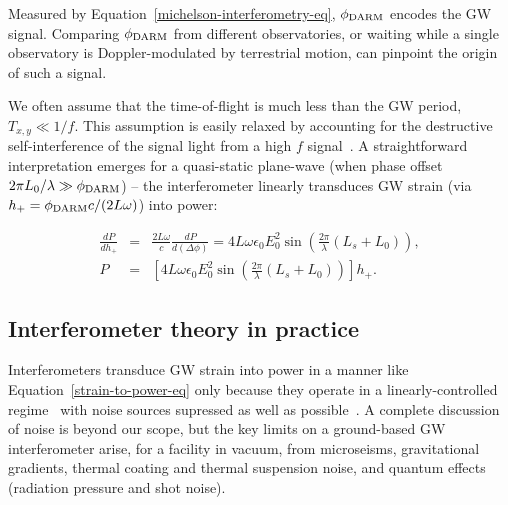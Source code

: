 \noindent Measured by Equation~\ref{michelson-interferometry-eq}, $\phi_{\textup{DARM}}$ encodes the GW signal.
Comparing $\phi_{\textup{DARM}}$ from different observatories, or waiting while a single observatory is Doppler-modulated by terrestrial motion, can pinpoint the origin of such a signal.

We often assume that the time-of-flight is much less than the GW period, $T_{x,y} \ll 1/f$.
This assumption is easily relaxed by accounting for the destructive self-interference of the signal light from a high $f$ signal~\cite{Saulson}.
A straightforward interpretation emerges for a quasi-static plane-wave (when phase offset $2\pi L_0/\lambda \gg \phi_\textup{DARM}$) -- the interferometer linearly transduces GW strain (via $h_+ = \phi_\textup{DARM}c/(2L\omega)$) into power:

\begin{eqnarray}
\frac{d P}{d h_+} &=& \frac{2L\omega}{c}\frac{dP}{d(\Delta\phi)} = 4 L\omega \epsilon_0 E_0^2 \sin \left(\frac{2\pi}{\lambda} (L_s+L_0) \right),\\
P &=& \left[ 4 L \omega \epsilon_0 E_0^2 \sin \left(\frac{2\pi}{\lambda} (L_s+L_0) \right) \right] h_+.
\label{strain-to-power-eq}
\end{eqnarray}




            \subsection{Interferometer theory in practice}
            \label{interferometer_theory}

Interferometers transduce GW strain into power in a manner like Equation~\ref{strain-to-power-eq} only because they operate in a linearly-controlled regime~\cite{FrickeThesis} with noise sources supressed as well as possible~\cite{Saulson,LIGOWorks}.
A complete discussion of noise is beyond our scope, but the key limits on a ground-based GW interferometer arise, for a facility in vacuum, from microseisms, gravitational gradients, thermal coating and thermal suspension noise, and quantum effects (radiation pressure and shot noise).

